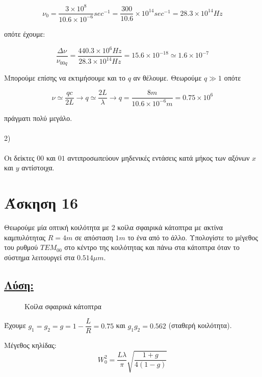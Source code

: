 \documentclass[a4paper,11pt,titlepage]{article}
\begin{document}
\begin{equation}
 \nu_0=\frac{3\times10^8}{10.6\times10^{-6}}sec^{-1}=\frac{300}{10.6}\times10^{14}sec^{-1}=28.3\times10^{14}Hz
\end{equation}

οπότε έχουμε:

\begin{equation}
  \dfrac{\Delta\nu}{\nu_{00q}}=\frac{440.3\times10^6 Hz}{28.3\times10^{14}Hz}=15.6\times10^{-18}\simeq1.6\times10^{-7}
\end{equation}

Μπορούμε επίσης να εκτιμήσουμε και το $q$ αν θέλουμε. Θεωρούμε $q\gg1$ οπότε 

\begin{equation}
\nu\simeq \dfrac{qc}{2L}\longrightarrow q\simeq \dfrac{2L}{\lambda}\longrightarrow q=\dfrac{8m}{10.6\times10^{-6}m}=0.75\times10^6
\end{equation}

πράγματι πολύ μεγάλο.
\\\\
2)
\\\\
Οι δείκτες $00$ και $01$ αντιπροσωπεύουν μηδενικές εντάσεις κατά μήκος των αξόνων $x$ και $y$ αντίστοιχα.

\newpage
\section{Άσκηση 16}

Θεωρούμε μία οπτική κοιλότητα με 2 κοίλα σφαιρικά κάτοπτρα με ακτίνα καμπυλότητας $R=4m$ σε απόσταση $1m$ το ένα από το άλλο. Υπολογίστε το μέγεθος του ρυθμού $TEM_{00}$ στο κέντρο της κοιλότητας και πάνω στα κάτοπτρα όταν το σύστημα λειτουργεί στα $0.514\mu m$.

\subsection*{\underline{Λύση:}}

\begin{figure}[!h]
\centering
\caption{Κοίλα σφαιρικά κάτοπτρα}
\end{figure}

Έχουμε $g_1=g_2=g=1-\dfrac{L}{R}=0.75$ και $g_1g_2=0.562$ (σταθερή κοιλότητα).

Μέγεθος κηλίδας:
\begin{equation}
 W_0^2=\frac{L\lambda}{\pi}\sqrt{\dfrac{1+g}{4(1-g)}}
\end{equation}
\end{document}
